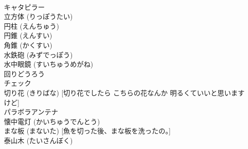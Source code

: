 \documentclass[8pt]{extreport}
\begin{document}
\begin{CJK}{UTF8}{min}
\\	キャタピラー 
\\	立方体 (りっぽうたい) 
\\	円柱 (えんちゅう) 
\\	円錐 (えんすい) 
\\	角錐 (かくすい) 
\\	水鉄砲 (みずでっぽう) 
\\	水中眼鏡 (すいちゅうめがね) 
\\	回りどうろう
\\	チェック
\\	切り花 (きりばな) [切り花でしたら こちらの花なんか 明るくていいと思いますけど]
\\	パラボラアンテナ 
\\	懐中電灯 (かいちゅうでんとう)
\\	まな板 (まないた) [魚を切った後、まな板を洗ったの。]
\\	泰山木 (たいさんぼく)
\end{CJK}
\end{document}
